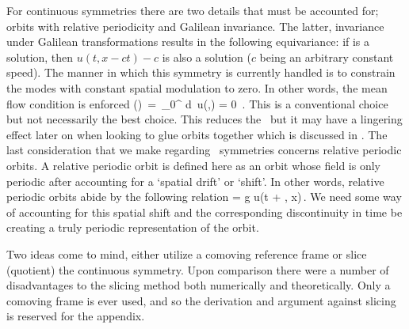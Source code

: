 For continuous symmetries there are two details that must be accounted for; orbits with relative periodicity and Galilean invariance.
The latter, invariance under Galilean transformations results in the following equivariance: if \ufield is a solution, then
$u(t, x - ct) - c$ is also a solution ($c$ being an arbitrary constant speed). The manner in which this symmetry is currently handled
is to constrain the modes with constant spatial modulation to zero. In other words, the mean flow condition is enforced
\beq
{}(\zeit)
  \,=\, \int_0^{\speriod{}} d\conf \, u(\conf,\zeit) = 0
\,.
This is a conventional choice but not necessarily the best choice. This reduces
the \cdof\ but it may have a lingering effect later on when looking to glue orbits together which is
discussed in .
The last consideration that we make regarding \spt\ symmetries concerns relative periodic orbits.
A relative periodic orbit is defined here as an orbit whose field \dufield is only
periodic after accounting for a `spatial drift' or `shift'. In other words, relative
periodic orbits abide by the following relation
\beq
\ufield = g \circ u(t + \period{}, x)\,.
\eeq
We need some way of accounting for this spatial shift and the corresponding
discontinuity in time be creating a truly periodic representation of the orbit.

Two ideas come to mind, either utilize a comoving reference frame or slice (quotient)
the continuous symmetry. Upon comparison there were a number of disadvantages to the
slicing method both numerically and theoretically. Only a comoving frame is ever used,
and so the derivation and argument against slicing is reserved for the appendix.

